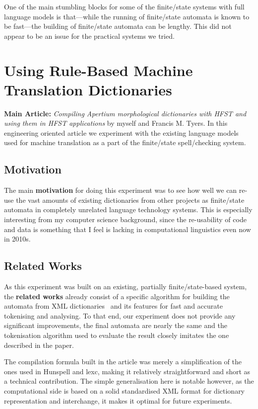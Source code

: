 \documentclass[officiallayout,final]{unihelcompling}
\begin{document}
One of the main stumbling blocks for some of the finite\-/state systems with full
language models is that---while the running of finite\-/state automata is known
to be fast---the building of finite\-/state automata can be lengthy. This did
not appear to be an issue for the practical systems we tried.


\section{Using Rule-Based Machine Translation Dictionaries}
\label{sec:apertium}

\textbf{Main Article:} \emph{Compiling Apertium morphological dictionaries with
HFST and using them in HFST applications} by myself and Francis M. Tyers. In
this engineering oriented article we experiment with the existing language
models used for machine translation as a part of the finite\-/state
spell\-/checking system.

\subsection{Motivation}

The main \textbf{motivation} for doing this experiment was to see how well we
can re-use the vast amounts of existing dictionaries from other projects as
finite\-/state automata in completely unrelated language technology systems.
This is especially interesting from my computer science background, since
the re-usability of code and data is something that I feel is lacking in
computational linguistics even now in 2010s.

\subsection{Related Works}

As this experiment was built on an existing, partially finite\-/state-based
system, the \textbf{related works} already consist of a specific algorithm for
building the automata from XML dictionaries~\citep{rojas2005construccion} and
its features for fast and accurate tokenising and analysing. To that end, our
experiment does not provide any significant improvements, the final automata
are nearly the same and the tokenisation algorithm used to evaluate the result
closely imitates the one described in the paper.

The compilation formula built in the article was merely a simplification of
the ones used in Hunspell and lexc, making it relatively straightforward and
short as a technical contribution. The simple generalisation here is notable
however, as the computational side is based on a solid standardised XML
format for dictionary representation and interchange, it makes it optimal
for future experiments.
\end{document}
